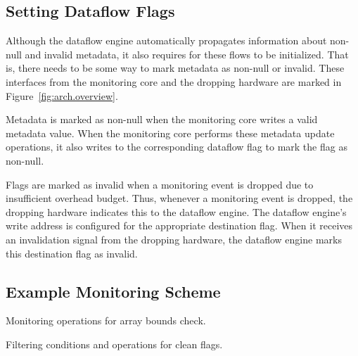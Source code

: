 \subsection{Setting Dataflow Flags}
\label{sec:arch.dropping}

Although the dataflow engine automatically propagates information about
non-null and invalid metadata, it also requires for these flows to be
initialized. That is, there needs to be some way to mark metadata as non-null
or invalid. These interfaces from the monitoring core and the dropping hardware
are marked in Figure~\ref{fig:arch.overview}.

Metadata is marked as non-null when the monitoring core writes a valid metadata
value. When the monitoring core performs these metadata update operations, it
also writes to the corresponding dataflow flag to mark the flag as non-null.

Flags are marked as invalid when a monitoring event is dropped due to
insufficient overhead budget. Thus, whenever a monitoring event is dropped, the
dropping hardware indicates this to the dataflow engine. The dataflow engine's
write address is configured for the appropriate destination flag. When it
receives an invalidation signal from the dropping hardware, the
dataflow engine marks this destination flag as invalid.

\subsection{Example Monitoring Scheme}

\begin{table}[tb]
  \begin{center}
    \begin{small}
    
    \end{small}
    \caption{Monitoring operations for array bounds check.}
    \label{tab:arch.monitor}
    \vspace{-0.2in}
  \end{center}
\end{table}

\begin{table}[tb]
  \begin{center}
    \begin{small}
    
    \end{small}
    \caption{Filtering conditions and operations for clean flags.}
    \label{tab:arch.dataflow_operations}
    \vspace{-0.2in}
  \end{center}
\end{table}

